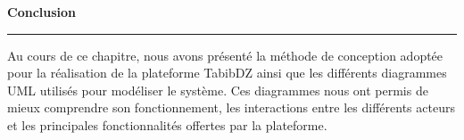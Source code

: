 \documentclass[12pt,a4paper]{report}
\begin{document}
\thispagestyle{empty}
\vspace*{\fill}

\begin{center}
{\Huge\bfseries\color{primaryblue} Conclusion}

\vspace{0.3cm}

{\color{primaryblue}\rule{0.5\textwidth}{1.2pt}}
\end{center}

\vspace{0.8cm}


Au cours de ce chapitre, nous avons pr\'esent\'e la m\'ethode de conception adopt\'ee pour la r\'ealisation de la plateforme TabibDZ ainsi que les diff\'erents diagrammes UML utilis\'es pour mod\'eliser le syst\`eme. Ces diagrammes nous ont permis de mieux comprendre son fonctionnement, les interactions entre les diff\'erents acteurs et les principales fonctionnalit\'es offertes par la plateforme.

\vspace*{\fill}
\end{document}
